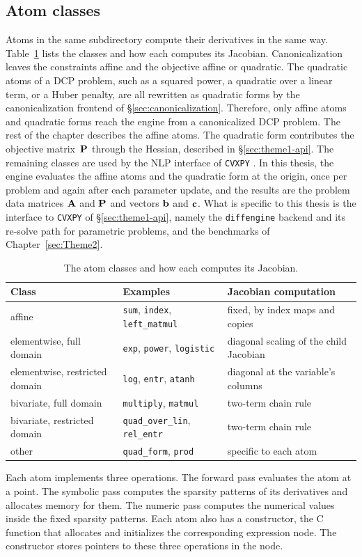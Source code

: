 \subsection{Atom classes}\label{sec:theme1-atom-classes}
Atoms in the same subdirectory compute their derivatives in the same way.
Table~\ref{tab:atom-classes} lists the classes and how each computes its Jacobian.
Canonicalization leaves the constraints affine and the
objective affine or quadratic. The quadratic atoms of a DCP problem, such as a squared power,
a quadratic over a linear term, or a Huber penalty, are all rewritten as quadratic forms by
the canonicalization frontend of \S\ref{sec:canonicalization}. Therefore, only affine atoms
and quadratic forms reach the engine from a canonicalized DCP problem.
The rest of the chapter describes the affine atoms. The quadratic form contributes the
objective matrix~$\mathbf{P}$ through the Hessian, described in \S\ref{sec:theme1-api}. The
remaining classes are used by the \ac{NLP} interface of
\texttt{CVXPY} \cite{cederberg2025disciplined}.
In this thesis, the engine evaluates the affine atoms and the quadratic form at the origin,
once per problem and again after each parameter update, and the results are the problem data
matrices $\mathbf{A}$ and $\mathbf{P}$ and vectors $\mathbf{b}$ and $\mathbf{c}$. What is specific to
this thesis is the interface to \texttt{CVXPY} of \S\ref{sec:theme1-api}, namely the
\texttt{diffengine} backend and its re-solve path for parametric problems, and the benchmarks
of Chapter~\ref{sec:Theme2}.
\begin{table}[tb]
\caption{The atom classes and how each computes its Jacobian.}
\label{tab:atom-classes}
\centering
\begin{tabular}{llp{4.5cm}}
\toprule
Class & Examples & Jacobian computation \\
\midrule
affine & \texttt{sum}, \texttt{index}, \texttt{left\_matmul} & fixed, by index maps and copies \\
elementwise, full domain & \texttt{exp}, \texttt{power}, \texttt{logistic} & diagonal
scaling of the child Jacobian \\
elementwise, restricted domain & \texttt{log}, \texttt{entr}, \texttt{atanh} & diagonal at
the variable's columns \\
bivariate, full domain & \texttt{multiply}, \texttt{matmul} & two-term chain rule \\
bivariate, restricted domain & \texttt{quad\_over\_lin}, \texttt{rel\_entr} & two-term
chain rule \\
other & \texttt{quad\_form}, \texttt{prod} & specific to each atom \\
\bottomrule
\end{tabular}
\end{table}
Each atom implements three operations. The forward pass evaluates the atom at a point. The
symbolic pass computes the sparsity patterns of its derivatives and allocates memory for
them. The numeric pass computes the numerical values inside the fixed sparsity patterns.
Each atom also has a constructor, the C function that allocates and initializes the
corresponding expression node. The constructor stores
pointers to these three operations in the node.

